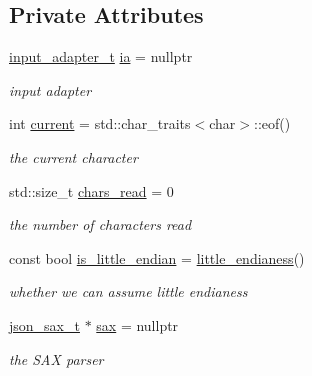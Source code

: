 \subsection*{Private Attributes}
\begin{DoxyCompactItemize}
\item 
\mbox{\hyperlink{namespacenlohmann_1_1detail_ae132f8cd5bb24c5e9b40ad0eafedf1c2}{input\+\_\+adapter\+\_\+t}} \mbox{\hyperlink{classnlohmann_1_1detail_1_1binary__reader_a21ceb754c46a4920b966be7de48c34ad}{ia}} = nullptr
\begin{DoxyCompactList}\small\item\em input adapter \end{DoxyCompactList}\item 
int \mbox{\hyperlink{classnlohmann_1_1detail_1_1binary__reader_aadd621ccddf3539f2ed4e2038d531870}{current}} = std\+::char\+\_\+traits$<$char$>$\+::eof()
\begin{DoxyCompactList}\small\item\em the current character \end{DoxyCompactList}\item 
std\+::size\+\_\+t \mbox{\hyperlink{classnlohmann_1_1detail_1_1binary__reader_a287aa2641bfcb0e47f6cd4657692f9a2}{chars\+\_\+read}} = 0
\begin{DoxyCompactList}\small\item\em the number of characters read \end{DoxyCompactList}\item 
const bool \mbox{\hyperlink{classnlohmann_1_1detail_1_1binary__reader_aa846bdda08720535b26d8c90b939bc37}{is\+\_\+little\+\_\+endian}} = \mbox{\hyperlink{classnlohmann_1_1detail_1_1binary__reader_a1e31dbfcf9567c8c2d4f0e4eb1b0230a}{little\+\_\+endianess}}()
\begin{DoxyCompactList}\small\item\em whether we can assume little endianess \end{DoxyCompactList}\item 
\mbox{\hyperlink{classnlohmann_1_1detail_1_1binary__reader_a43c5dc6a3219f64a7824d7ba9c7b14ae}{json\+\_\+sax\+\_\+t}} $\ast$ \mbox{\hyperlink{classnlohmann_1_1detail_1_1binary__reader_ac9313177e414403e3e5784340d838b3f}{sax}} = nullptr
\begin{DoxyCompactList}\small\item\em the S\+AX parser \end{DoxyCompactList}\end{DoxyCompactItemize}


